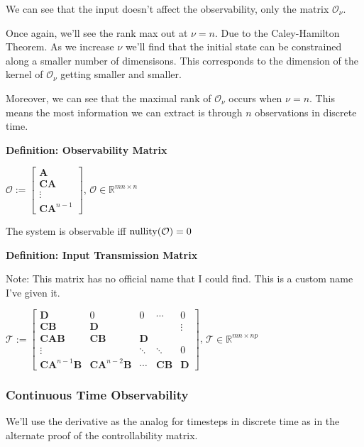 \documentclass[11pt]{article}
\begin{document}
  \pagebreak

  We can see that the input doesn't affect the observability, only the matrix \(\mathcal{O}_{\nu}\).

  Once again, we'll see the rank max out at \(\nu = n\). Due to the Caley-Hamilton Theorem. As we
  increase \(\nu\) we'll find that the initial state can be constrained along a smaller number of dimensisons.
  This corresponds to  the dimension of the kernel of \(\mathcal{O}_{\nu}\) getting smaller
  and smaller.

  Moreover, we can see that the maximal rank of \(\mathcal{O}_{\nu}\) occurs when \(\nu = n\). This means the
  most information we can extract is through \(n\) observations in discrete time.

  \vspace{12pt}

  \textbf{Definition: Observability Matrix}

  \(\mathcal{O} := \begin{bmatrix} \bm{A} \\ \bm{CA} \\ \vdots \\ \bm{C}\bm{A}^{n - 1}\end{bmatrix}\),
  \(\mathcal{O} \in \mathbb{R}^{mn \times n}\)

  The system is observable iff \(\mathrm{nullity}{\left( \mathcal{O} \right)} = 0\)

  \textbf{Definition: Input Transmission Matrix}

  Note: This matrix has no official name that I could find. This is a custom name I've given it.

  \(\mathcal{T} :=
  \begin{bmatrix}
    \bm{D} & 0 & 0 & \cdots & 0\\
    \bm{C}\bm{B} & \bm{D} & & & \vdots \\
    \bm{C}\bm{A}\bm{B} & \bm{C}\bm{B} & \bm{D} \\
    \vdots & & \ddots & \ddots & 0 \\
    \bm{C}\bm{A}^{n - 1}\bm{B} & \bm{C}\bm{A}^{n - 2}\bm{B} & \cdots &
    \bm{CB} & \bm{D}
  \end{bmatrix}\), \(\mathcal{T} \in \mathbb{R}^{mn \times np}\)

  \subsubsection{Continuous Time Observability}

  We'll use the derivative as the analog for timesteps in discrete time as in the alternate proof of the
  controllability matrix.
\end{document}
